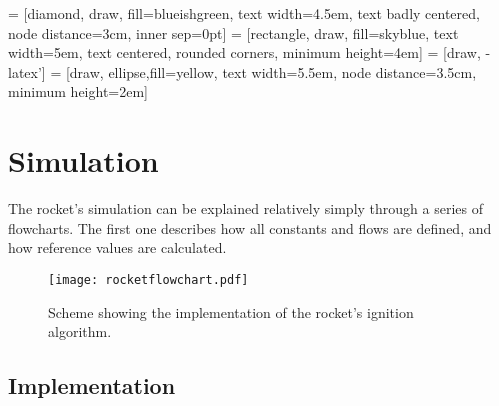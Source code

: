  = [diamond, draw, fill=blueishgreen,
    text width=4.5em, text badly centered, node distance=3cm, inner sep=0pt]
 = [rectangle, draw, fill=skyblue,
    text width=5em, text centered, rounded corners, minimum height=4em]
 = [draw, -latex']
 = [draw, ellipse,fill=yellow, text width=5.5em, node distance=3.5cm,
    minimum height=2em]



\chapter{Simulation}

The rocket's simulation can be explained relatively simply through a series of flowcharts. The first one describes how all constants and flows are defined, and how reference values are calculated.
%
\begin{figure}
	\centering
	\texttt{[image: rocketflowchart.pdf]}
	\caption{Scheme showing the implementation of the rocket's ignition algorithm.}
	\label{fig:flowchart}
\end{figure}


\section{Implementation}

